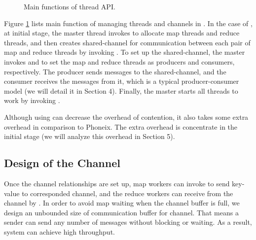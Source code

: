 


\label{sec:pm:thread}
\begin{figure}[htpb]

\caption{Main functions of \myds thread API.}
\label{fig:api:thread}
\end{figure}

Figure \ref{fig:api:thread} lists main function of managing threads and channels in \myth.
In the case of \myds, at initial stage, the master thread invokes  to allocate map threads and reduce threads, and then creates  shared-channel for communication between each pair of map  and reduce threads by invoking .
To set up the shared-channel, the master invokes  and  to set the map and reduce threads as producers and consumers, respectively. 
The producer sends messages to the shared-channel, and the consumer receives the messages from it,
which is a typical producer-consumer model (we will detail it in Section 4). 
Finally, the master starts all threads to work by invoking .

Although using \myth can decrease the overhead of contention,
it also takes some extra overhead in comparison to Phoneix. The extra overhead 
is concentrate in the initial stage (we will analyze this overhead in Section 5). 


\subsection{Design of the Channel}
Once the channel relationships are set up, 
map workers can invoke  to send key-value to corresponded channel,
and the reduce workers can receive from the channel by .
In order to avoid map waiting when the channel buffer is full,
we design an unbounded size of communication buffer for channel.
That means a sender can send any number of messages without blocking or waiting.
As a result, system can achieve high throughput.


